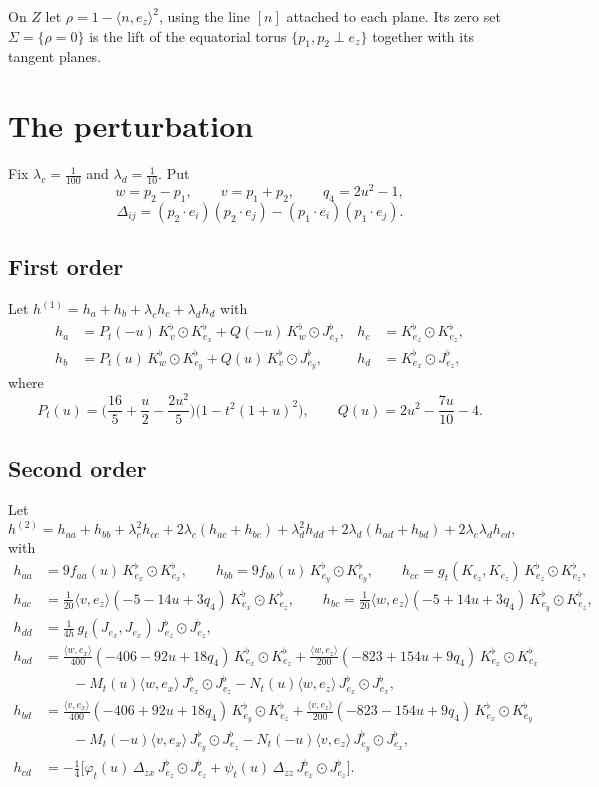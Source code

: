 \documentclass[11pt]{amsart}
\theoremstyle{definition}
\theoremstyle{remark}
\newcommand{\sym}{\odot}
\newcommand{\fl}{^{\flat}}
\begin{document}
On $Z$ let $\rho=1-\langle n,e_z\rangle^2$, using the line $[n]$ attached to each plane. Its zero set $\Sigma=\{\rho=0\}$ is the lift of the equatorial torus $\{p_1,p_2\perp e_z\}$ together with its tangent planes.

\section{The perturbation}\label{sec:perturbation}

Fix $\lambda_c=\frac1{100}$ and $\lambda_d=\frac1{10}$. Put
\[ w=p_2-p_1,\qquad v=p_1+p_2,\qquad q_4=2u^2-1, \]
\[ \Delta_{ij}=(p_2\cdot e_i)(p_2\cdot e_j)-(p_1\cdot e_i)(p_1\cdot e_j) . \]

\subsection{First order}
Let $h^{(1)}=h_a+h_b+\lambda_ch_c+\lambda_dh_d$ with
\begin{align*}
h_a&=P_t(-u)\,K\fl_{v}\sym K\fl_{e_x}+Q(-u)\,K\fl_{w}\sym J\fl_{e_x}, &
h_c&=K\fl_{e_z}\sym K\fl_{e_z},\\
h_b&=P_t(u)\,K\fl_{w}\sym K\fl_{e_y}+Q(u)\,K\fl_{v}\sym J\fl_{e_y}, &
h_d&=K\fl_{e_x}\sym J\fl_{e_z},
\end{align*}
where
\[ P_t(u)=\Big(\frac{16}5+\frac u2-\frac{2u^2}5\Big)\big(1-t^2(1+u)^2\big),\qquad Q(u)=2u^2-\frac{7u}{10}-4 . \]

\subsection{Second order}
Let
\[ h^{(2)}=h_{aa}+h_{bb}+\lambda_c^2h_{cc}+2\lambda_c(h_{ac}+h_{bc})+\lambda_d^2h_{dd}+2\lambda_d(h_{ad}+h_{bd})+2\lambda_c\lambda_dh_{cd}, \]
with
\begin{align*}
h_{aa}&=9f_{aa}(u)\,K\fl_{e_x}\sym K\fl_{e_x},\qquad
h_{bb}=9f_{bb}(u)\,K\fl_{e_y}\sym K\fl_{e_y},\qquad
h_{cc}=g_t(K_{e_z},K_{e_z})\,K\fl_{e_z}\sym K\fl_{e_z},\\
h_{ac}&=\tfrac1{20}\langle v,e_z\rangle(-5-14u+3q_4)\,K\fl_{e_x}\sym K\fl_{e_z},\qquad
h_{bc}=\tfrac1{20}\langle w,e_z\rangle(-5+14u+3q_4)\,K\fl_{e_y}\sym K\fl_{e_z},\\
h_{dd}&=\tfrac1{4h}\,g_t(J_{e_x},J_{e_x})\,J\fl_{e_z}\sym J\fl_{e_z},\\
h_{ad}&=\tfrac{\langle w,e_x\rangle}{400}(-406-92u+18q_4)\,K\fl_{e_x}\sym K\fl_{e_z}
+\tfrac{\langle w,e_z\rangle}{200}(-823+154u+9q_4)\,K\fl_{e_x}\sym K\fl_{e_x}\\
&\qquad-M_t(u)\langle w,e_x\rangle\,J\fl_{e_x}\sym J\fl_{e_z}-N_t(u)\langle w,e_z\rangle\,J\fl_{e_x}\sym J\fl_{e_x},\\
h_{bd}&=\tfrac{\langle v,e_x\rangle}{400}(-406+92u+18q_4)\,K\fl_{e_y}\sym K\fl_{e_z}
+\tfrac{\langle v,e_z\rangle}{200}(-823-154u+9q_4)\,K\fl_{e_x}\sym K\fl_{e_y}\\
&\qquad-M_t(-u)\langle v,e_x\rangle\,J\fl_{e_y}\sym J\fl_{e_z}-N_t(-u)\langle v,e_z\rangle\,J\fl_{e_y}\sym J\fl_{e_x},\\
h_{cd}&=-\tfrac14\big[\varphi_t(u)\,\Delta_{zx}\,J\fl_{e_z}\sym J\fl_{e_z}+\psi_t(u)\,\Delta_{zz}\,J\fl_{e_x}\sym J\fl_{e_z}\big].
\end{align*}
\end{document}
